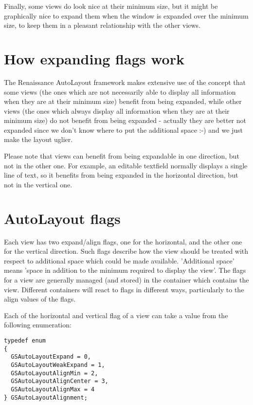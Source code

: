 Finally, some views do look nice at their minimum size, but it might
be graphically nice to expand them when the window is expanded over
the minimum size, to keep them in a pleasant relationship with the
other views.

\section{How expanding flags work}

The Renaissance AutoLayout framework makes extensive use of the
concept that some views (the ones which are not necessarily able to
display all information when they are at their minimum size) benefit
from being expanded, while other views (the ones which always display
all information when they are at their minimum size) do not benefit
from being expanded - actually they are better not expanded since we
don't know where to put the additional space :-) and we just make the
layout uglier.

Please note that views can benefit from being expandable in one
direction, but not in the other one.  For example, an editable
textfield normally displays a single line of text, so it benefits from
being expanded in the horizontal direction, but not in the vertical
one.

\section{AutoLayout flags}

Each view has two expand/align flags, one for the horizontal, and the
other one for the vertical direction.  Such flags describe how the
view should be treated with respect to additional space which could be
made available.  'Additional space' means 'space in addition to the
minimum required to display the view'.  The flags for a view are
generally managed (and stored) in the container which contains the
view.  Different containers will react to flags in different ways,
particularly to the align values of the flags.

Each of the horizontal and vertical flag of a view can take a value
from the following enumeration:
\begin{verbatim}
typedef enum 
{
  GSAutoLayoutExpand = 0,
  GSAutoLayoutWeakExpand = 1,
  GSAutoLayoutAlignMin = 2,
  GSAutoLayoutAlignCenter = 3,
  GSAutoLayoutAlignMax = 4
} GSAutoLayoutAlignment;
\end{verbatim}

